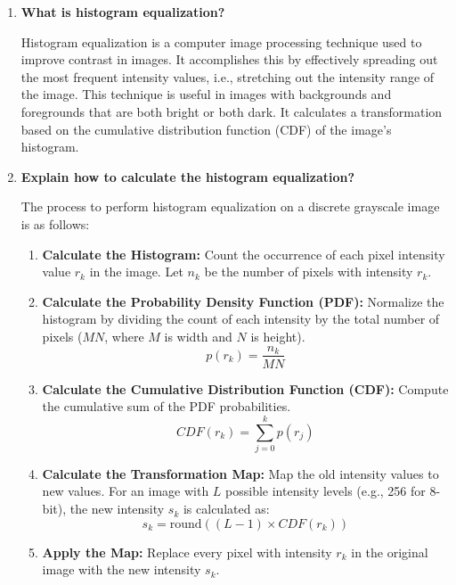 \documentclass{article}
\begin{document}
\begin{enumerate}
    \item \textbf{What is histogram equalization?}
    
    Histogram equalization is a computer image processing technique used to improve contrast in images. It accomplishes this by effectively spreading out the most frequent intensity values, i.e., stretching out the intensity range of the image. This technique is useful in images with backgrounds and foregrounds that are both bright or both dark. It calculates a transformation based on the cumulative distribution function (CDF) of the image's histogram.

    \item \textbf{Explain how to calculate the histogram equalization?}
    
    The process to perform histogram equalization on a discrete grayscale image is as follows:
    
    \begin{enumerate}
        \item \textbf{Calculate the Histogram:} Count the occurrence of each pixel intensity value $r_k$ in the image. Let $n_k$ be the number of pixels with intensity $r_k$.
        
        \item \textbf{Calculate the Probability Density Function (PDF):} Normalize the histogram by dividing the count of each intensity by the total number of pixels ($MN$, where $M$ is width and $N$ is height).
        \[ p(r_k) = \frac{n_k}{MN} \]
        
        \item \textbf{Calculate the Cumulative Distribution Function (CDF):} Compute the cumulative sum of the PDF probabilities.
        \[ CDF(r_k) = \sum_{j=0}^{k} p(r_j) \]
        
        \item \textbf{Calculate the Transformation Map:} Map the old intensity values to new values. For an image with $L$ possible intensity levels (e.g., 256 for 8-bit), the new intensity $s_k$ is calculated as:
        \[ s_k = \text{round}((L - 1) \times CDF(r_k)) \]
        
        \item \textbf{Apply the Map:} Replace every pixel with intensity $r_k$ in the original image with the new intensity $s_k$.
    \end{enumerate}

\end{enumerate}
\end{document}
